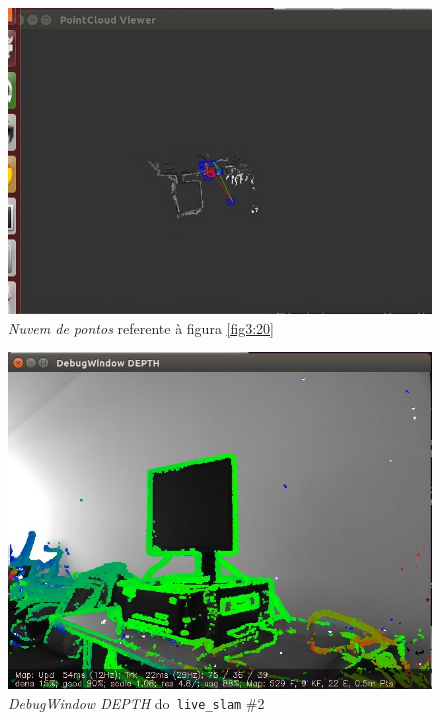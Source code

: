 \begin{figure}[H]
	\centering
		\includegraphics[width= \textwidth]{Imagens/figura3-21.jpg}
	\caption{\textit{Nuvem de pontos} referente à figura \ref{fig3:20}}
	\label{fig3:21}
\end{figure}

\begin{figure}[H]
	\centering
		\includegraphics[width= \textwidth]{Imagens/figura3-22.jpg}
	\caption{\textit{DebugWindow DEPTH} do\texttt{ live\_slam} \#2}
	\label{fig3:22}
\end{figure}

